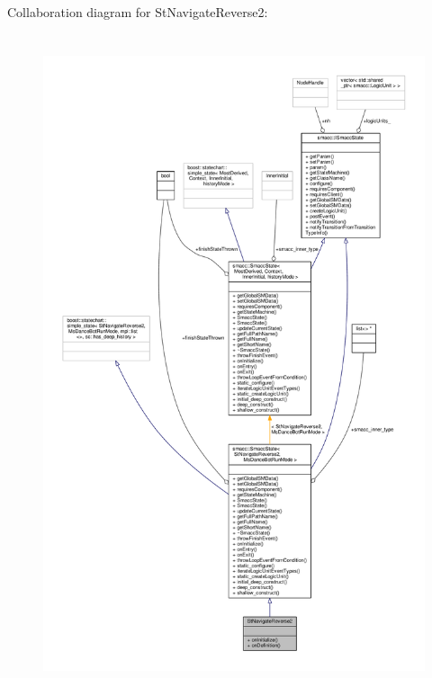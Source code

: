 Collaboration diagram for St\+Navigate\+Reverse2\+:
\nopagebreak
\begin{figure}[H]
\begin{center}
\leavevmode
\includegraphics[height=550pt]{structStNavigateReverse2__coll__graph}
\end{center}
\end{figure}
